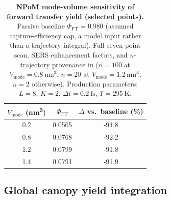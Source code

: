 \documentclass[preprint,12pt]{elsarticle}
\begin{document}
\begin{table}[htbp]
\centering
\caption{\textbf{NPoM mode-volume sensitivity of forward transfer yield (selected points).} Passive baseline $\Phi_{\mathrm{FT}} = 0.980$ (assumed capture-efficiency cap, a model input rather than a trajectory integral). Full seven-point scan, SERS enhancement factors, and $n$-trajectory provenance in  ($n=100$ at $V_{\mathrm{mode}}=\qty{0.8}{\nm\cubed}$, $n=20$ at $V_{\mathrm{mode}}=\qty{1.2}{\nm\cubed}$, $n=2$ otherwise). Production parameters: $L=8$, $K=2$, $\Delta t = \qty{0.2}{\fs}$, $T=\qty{295}{\kelvin}$.}
\label{tab:npom_volume_scan}
\begin{tabular}{S[table-format=1.1] S[table-format=1.4] S[table-format=-2.1]}
\toprule
{$V_{\mathrm{mode}}$ (\unit{\nm\cubed})} & {$\Phi_{\mathrm{FT}}$} & {$\Delta$ vs.\ baseline (\unit{\percent})} \\
 & 0.0505 & -94.8 \\
0.8 & 0.0768 & -92.2 \\
1.2 & 0.0799 & -91.8 \\
1.4 & 0.0791 & -91.9 \\
\bottomrule
\end{tabular}
\end{table}

\subsection{Global canopy yield integration}\label{sec:canopy}
\end{document}

